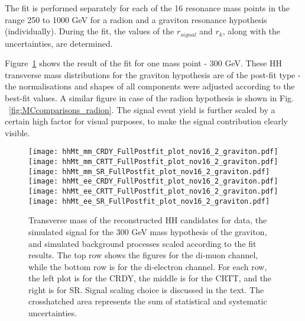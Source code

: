 The fit is performed separately for each of the 16 resonance mass points in the range 250 to 1000 GeV for a radion and a graviton resonance hypothesis (individually). During the fit, the values of the $r_{signal}$ and $r_k$, along with the uncertainties, are determined. 

Figure~\ref{fig:MCcomparisons} shows the result of the fit for one mass point - 300 GeV. These HH transverse mass distributions for the graviton hypothesis are of the post-fit type - the normalisations and shapes of all components were adjusted according to the best-fit values. A similar figure in case of the radion hypothesis is shown in Fig. ~\ref{fig:MCcomparisons_radion}. The signal event yield is further scaled by a certain high factor for visual purposes, to make the signal contribution clearly visible.                                                                                                                                                                                                                                                                                                                                                                                                                                                                                                                                                                                                                                                                                             

\begin{figure}[H]
  \begin{center}
    \texttt{[image: hhMt\_mm\_CRDY\_FullPostfit\_plot\_nov16\_2\_graviton.pdf]}
    \texttt{[image: hhMt\_mm\_CRTT\_FullPostfit\_plot\_nov16\_2\_graviton.pdf]}
    \texttt{[image: hhMt\_mm\_SR\_FullPostfit\_plot\_nov16\_2\_graviton.pdf]} \\
    \texttt{[image: hhMt\_ee\_CRDY\_FullPostfit\_plot\_nov16\_2\_graviton.pdf]}
    \texttt{[image: hhMt\_ee\_CRTT\_FullPostfit\_plot\_nov16\_2\_graviton.pdf]}
    \texttt{[image: hhMt\_ee\_SR\_FullPostfit\_plot\_nov16\_2\_graviton.pdf]}
    \caption[Transverse mass of the reconstructed HH candidates for graviton hypothesis.]{Transverse mass of the reconstructed HH candidates for data, the simulated signal for the 300 GeV mass hypothesis of the graviton, and simulated background processes scaled according to the fit results. The top row shows the figures for the di-muon channel, while the bottom row is for the di-electron channel. For each row, the left plot is for the CRDY, the middle is for the CRTT, and the right is for SR. Signal scaling choice is discussed in the text. The crosshatched area represents the sum of statistical and systematic uncertainties.}
    \label{fig:MCcomparisons}                                                                         
  \end{center}
\end{figure}

